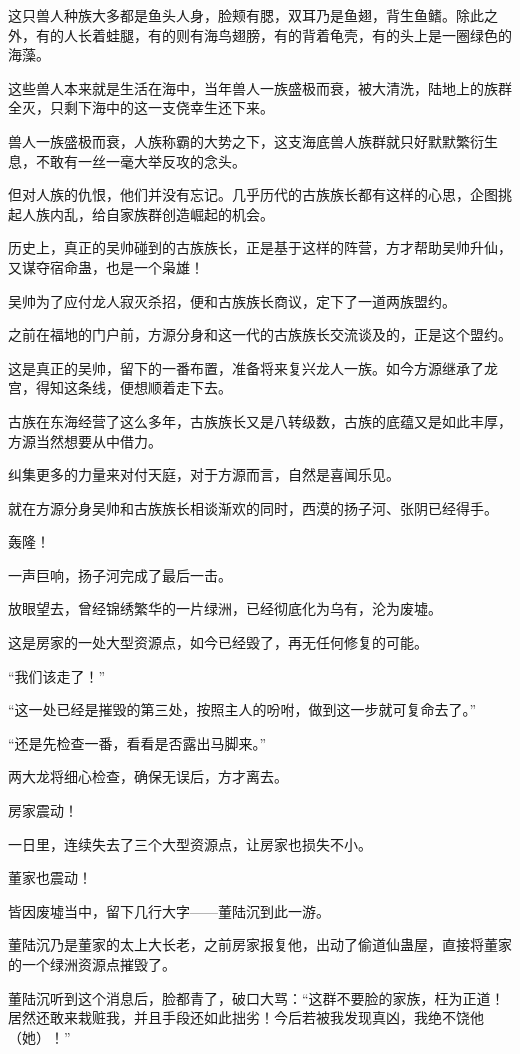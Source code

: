 \begin{this_body}
这只兽人种族大多都是鱼头人身，脸颊有腮，双耳乃是鱼翅，背生鱼鳍。除此之外，有的人长着蛙腿，有的则有海鸟翅膀，有的背着龟壳，有的头上是一圈绿色的海藻。

这些兽人本来就是生活在海中，当年兽人一族盛极而衰，被大清洗，陆地上的族群全灭，只剩下海中的这一支侥幸生还下来。

兽人一族盛极而衰，人族称霸的大势之下，这支海底兽人族群就只好默默繁衍生息，不敢有一丝一毫大举反攻的念头。

但对人族的仇恨，他们并没有忘记。几乎历代的古族族长都有这样的心思，企图挑起人族内乱，给自家族群创造崛起的机会。

历史上，真正的吴帅碰到的古族族长，正是基于这样的阵营，方才帮助吴帅升仙，又谋夺宿命蛊，也是一个枭雄！

吴帅为了应付龙人寂灭杀招，便和古族族长商议，定下了一道两族盟约。

之前在福地的门户前，方源分身和这一代的古族族长交流谈及的，正是这个盟约。

这是真正的吴帅，留下的一番布置，准备将来复兴龙人一族。如今方源继承了龙宫，得知这条线，便想顺着走下去。

古族在东海经营了这么多年，古族族长又是八转级数，古族的底蕴又是如此丰厚，方源当然想要从中借力。

纠集更多的力量来对付天庭，对于方源而言，自然是喜闻乐见。

就在方源分身吴帅和古族族长相谈渐欢的同时，西漠的扬子河、张阴已经得手。

轰隆！

一声巨响，扬子河完成了最后一击。

放眼望去，曾经锦绣繁华的一片绿洲，已经彻底化为乌有，沦为废墟。

这是房家的一处大型资源点，如今已经毁了，再无任何修复的可能。

“我们该走了！”

“这一处已经是摧毁的第三处，按照主人的吩咐，做到这一步就可复命去了。”

“还是先检查一番，看看是否露出马脚来。”

两大龙将细心检查，确保无误后，方才离去。

房家震动！

一日里，连续失去了三个大型资源点，让房家也损失不小。

董家也震动！

皆因废墟当中，留下几行大字——董陆沉到此一游。

董陆沉乃是董家的太上大长老，之前房家报复他，出动了偷道仙蛊屋，直接将董家的一个绿洲资源点摧毁了。

董陆沉听到这个消息后，脸都青了，破口大骂：“这群不要脸的家族，枉为正道！居然还敢来栽赃我，并且手段还如此拙劣！今后若被我发现真凶，我绝不饶他（她）！”


\end{this_body}
